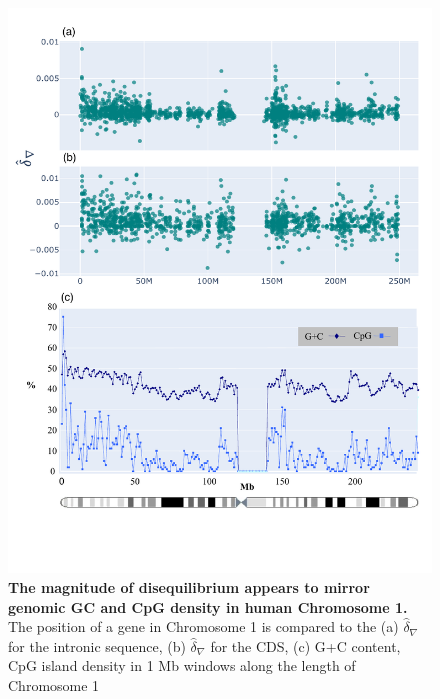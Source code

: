 \begin{figure}[htbp]
\centering
\includegraphics[width=\textwidth]{figures/plots/primate/nabla_CpG_appendix.pdf}
\caption[The magnitude of disequilibrium appears to mirror genomic GC and CpG density in human Chromosome 1]{\textbf{The magnitude of disequilibrium appears to mirror genomic GC and CpG density in human Chromosome 1.} The position of a gene in Chromosome 1 is compared to the (a) $\hat\delta_\nabla$ for the intronic sequence, (b) $\hat\delta_\nabla$ for the CDS, (c) G+C content, CpG island density in 1 Mb windows along the length of Chromosome 1 \citep[adapted from Supplementary Figure 1b]{Gregory2006TheChromosome11}}
\label{fig:primate:dconv-manhattan-appendix}
\end{figure}
